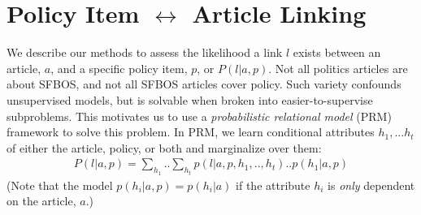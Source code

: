\documentclass[11pt]{article}
\begin{document}
\section{Policy Item $\leftrightarrow$ Article Linking}
\label{sct:sct-1}

We describe our methods to assess the likelihood a link $l$ exists between an article, $a$, and a specific policy item, $p$, or $P( l | a, p )$. Not all politics articles are about SFBOS, and not all SFBOS articles cover policy. Such variety confounds unsupervised models, but is solvable when broken into easier-to-supervise subproblems. This motivates us to use a \textit{probabilistic relational model} (PRM) framework \cite{getoor2002learning} to solve this problem. In PRM, we learn conditional attributes  $h_1, ... h_t$ of either the article, policy, or both and marginalize over them:
\begin{equation*}
\begin{split}
    P(l | a, p) = 
    \sum_{h_1} .. \sum_{h_t} p(l | a, p, h_1, ..,  h_t) .. p( h_1 | a, p)
\label{eq:factorized-link}
\end{split}
\end{equation*}
(Note that the model $p(h_i | a, p) = p(h_i | a)$ if the attribute $h_i$ is \textit{only} dependent on the article, $a$.) %
%
%
%
\end{document}
